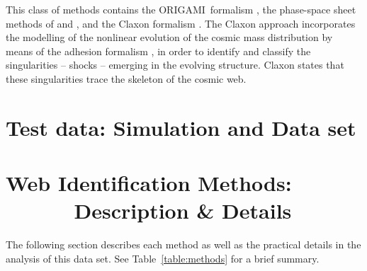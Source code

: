 \documentclass[useAMS,usenatbib]{mnras}
\newcommand{\origami}{\textsc{ORIGAMI}}
\begin{document}
\begin{itemize}
This class of methods contains the \origami\ formalism \citep{falck2012,falck2015}, the phase-space sheet methods of \cite{shandarin2011} 
\citep[also see][]{Ramachandara_Shandarin:15} and \cite{abel2012}, and the Claxon formalism \citep{hidding2017}. The Claxon approach incorporates the modelling of 
the nonlinear evolution of the cosmic mass distribution by means of the adhesion 
formalism \citep{gurbatov1989,hidding2012}, in order to identify and classify the singularities -- shocks -- emerging 
in the evolving structure. Claxon states that these singularities trace the skeleton of the cosmic web. 
\end{itemize}
\section{Test data:  Simulation and Data set}


\section{Web Identification Methods:\ \ \  \\ \ \ \ \ \ \ Description \& Details}
The following section describes each method as well as the practical details in the analysis of this data set. See Table~\ref{table:methods} for a brief summary.

%
\bigskip




%
\end{document}
